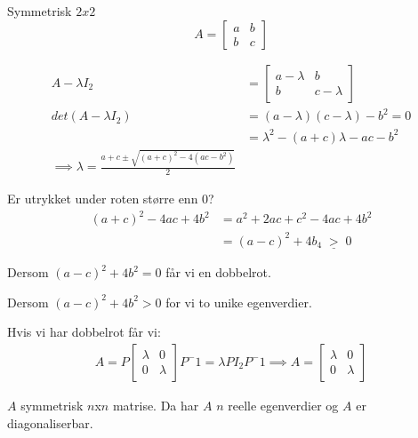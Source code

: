 \documentclass[11pt, a4paper, norsk]{article}
\begin{document}
        \begin{Example}{Symmetrisk $2x2$}{}
            $$
                A = \begin{bmatrix}
                    a & b \\
                    b & c
                \end{bmatrix}
            $$

            \begin{align*}
                A - \lambda I_2 &= \begin{bmatrix}
                    a-\lambda & b \\
                    b & c-\lambda
                \end{bmatrix} \\
                    det(A - \lambda I_2) &= (a-\lambda)(c-\lambda) - b^2 = 0 \\
                                         &= \lambda^2 -(a+c)\lambda - ac-b^2 \\
                    \implies \lambda = \frac{a+c \pm \sqrt{(a+c)^2 - 4(ac-b^2)}}{2}
                \end{align*}

                Er utrykket under roten større enn 0?
                \begin{align*}
                    (a+c)^2 -4ac + 4b^2 &= a^2 +2ac + c^2 - 4ac + 4b^2 \\
                                        &= (a-c)^2 + 4b_4 \; \underline{>} \; 0
                \end{align*}
                
                Dersom $(a-c)^2 + 4b^2 = 0$ får vi en dobbelrot. 

                Dersom $(a-c)^2 + 4b^2 > 0$ for vi to unike egenverdier. 
                

                Hvis vi har dobbelrot får vi:
                \begin{align*}
                    A = P\begin{bmatrix}
                        \lambda & 0 \\
                        0 & \lambda
                    \end{bmatrix}P^-1 = \lambda PI_2P^-1 \implies A = \begin{bmatrix}
                        \lambda & 0 \\
                        0 & \lambda
                    \end{bmatrix}
                \end{align*}
                
        \end{Example}
        \begin{Theorem}{}{}
            $A$ symmetrisk $n$x$n$ matrise. Da har $A$ $n$ reelle egenverdier og $A$ er diagonaliserbar.
        \end{Theorem}
\end{document}
